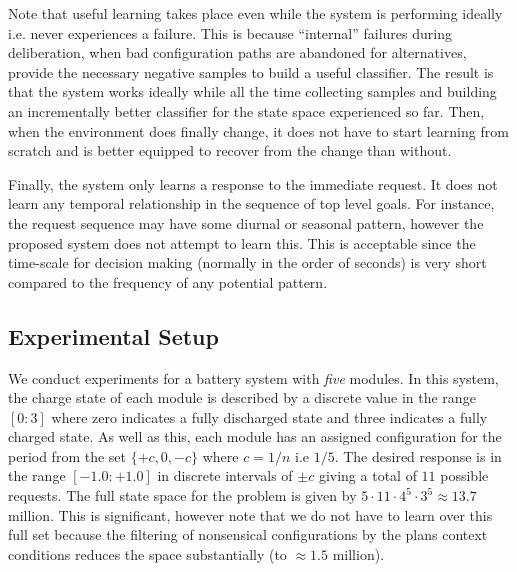 Note that useful learning takes place even while the system is performing ideally i.e. never experiences a failure. This is because ``internal'' failures during deliberation, when bad configuration paths are abandoned for alternatives, provide the necessary negative samples to build a useful classifier. The result is that the system works ideally while all the time collecting samples and building an incrementally better classifier for the state space experienced so far. Then, when the environment does finally change, it does not have to start learning from scratch and is better equipped to recover from the change than without.

Finally, the system only learns a response to the immediate request. It does not learn any temporal relationship in the sequence of top level goals. For instance, the request sequence may have some diurnal or seasonal pattern, however the proposed system does not attempt to learn this. This is acceptable since the time-scale for decision making (normally in the order of seconds) is very short compared to the frequency of any potential pattern.




\subsection{Experimental Setup}\label{subsec:setup}

We conduct experiments for a battery system with {\em five} modules. In this system, the charge state of each module is described by a discrete value in the range $[0:3]$ where zero indicates a fully discharged state and three indicates a fully charged state. As well as this, each module has an assigned configuration for the period from the set $\{+c, 0, -c\}$ where $c=1/n$ i.e $1/5$. The desired response is in the range $[-1.0:+1.0]$ in discrete intervals of $\pm c$ giving a total of $11$ possible requests. The full state space for the problem is given by $5 \cdot 11 \cdot 4^5 \cdot 3^5 \approx 13.7$ million. This is significant, however note that we do not have to learn over this full set because the filtering of nonsensical configurations by the plans context conditions reduces the space substantially (to $\approx 1.5$ million).

